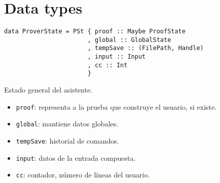 \documentclass[a4paper,11pt]{article}
\theoremstyle{definition}
\begin{document}
\begin{minipage}[t]{0.5\linewidth}
  \centering  

  \begin{prooftree}
  \end{prooftree}

  \begin{prooftree}
  \end{prooftree}

  \begin{prooftree}
  \end{prooftree}

  \begin{prooftree}  
  \end{prooftree}
  
\end{minipage}

\vspace{0.5cm}


\section{Data types}

\begin{verbatim}
data ProverState = PSt { proof :: Maybe ProofState
                       , global :: GlobalState
                       , tempSave :: (FilePath, Handle)
                       , input :: Input
                       , cc :: Int
                       }
\end{verbatim}

Estado general del asistente.
\begin{itemize}
  \item \texttt{proof}: representa a la prueba que construye el usuario, si existe.
  \item \texttt{global}: mantiene datos globales.
  \item \texttt{tempSave}: historial de comandos.
  \item \texttt{input}: datos de la entrada compuesta.
  \item \texttt{cc}: contador, número de líneas del usuario. 
\end{itemize}
\end{document}
